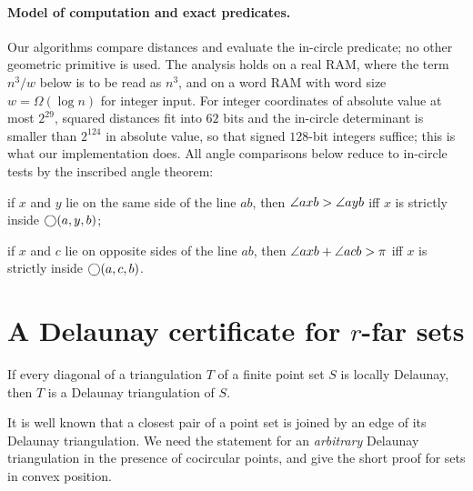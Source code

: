 \paragraph{Model of computation and exact predicates.}
Our algorithms compare distances and evaluate the in-circle predicate; no other
geometric primitive is used. The analysis holds on a real RAM, where the term
$n^3/w$ below is to be read as $n^3$, and on a word RAM with word size
$w=\Omega(\log n)$ for integer input. For integer coordinates of absolute value
at most $2^{29}$, squared distances fit into $62$ bits and the in-circle
determinant is smaller than $2^{124}$ in absolute value, so that signed
$128$-bit integers suffice; this is what our implementation does. All angle
comparisons below reduce to in-circle tests by the inscribed angle theorem:
\begin{description}[leftmargin=1.5em,itemsep=1pt]
\item[(I1)] if $x$ and $y$ lie on the same side of the line $ab$, then
$\angle axb>\angle ayb$ iff $x$ is strictly inside $\bigcirc(a,y,b)$;
\item[(I2)] if $x$ and $c$ lie on opposite sides of the line $ab$, then
$\angle axb+\angle acb>\pi$ iff $x$ is strictly inside $\bigcirc(a,c,b)$.
\end{description}

\section{A Delaunay certificate for \texorpdfstring{$r$}{r}-far sets}\label{sec:certificate}

\begin{lemma}\label{lem:delaunay}
If every diagonal of a triangulation $T$ of a finite point set $S$ is locally
Delaunay, then $T$ is a Delaunay triangulation of $S$.
\end{lemma}

It is well known that a closest pair of a point set is joined by an edge of
its Delaunay triangulation. We need the statement for an \emph{arbitrary}
Delaunay triangulation in the presence of cocircular points, and give the
short proof for sets in convex position.

